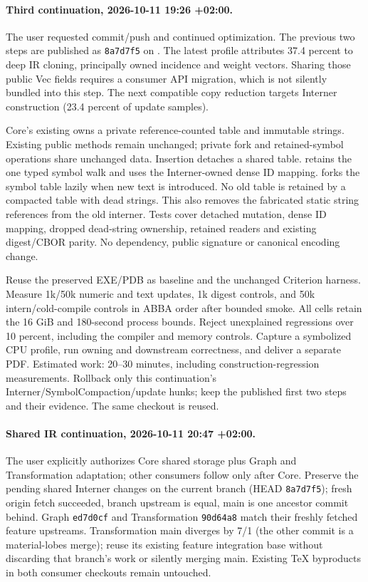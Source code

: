 \documentclass[11pt,a4paper]{article}
\begin{document}
\paragraph{Third continuation, 2026-10-11 19:26 +02:00.}
The user requested commit/push and continued optimization. The previous two steps
are published as \texttt{8a7d7f5} on .
The latest profile attributes 37.4 percent to deep IR cloning, principally owned
incidence and weight vectors. Sharing those public Vec fields requires a consumer
API migration, which is not silently bundled into this step. The next compatible
copy reduction targets Interner construction (23.4 percent of update samples).

Core's existing  owns a private reference-counted
table and immutable strings. Existing public methods remain unchanged; private
fork and retained-symbol operations share unchanged data. Insertion detaches a
shared table.  retains the one typed symbol walk and
uses the Interner-owned dense ID mapping.  forks
the symbol table lazily when new text is introduced. No old table is retained by
a compacted table with dead strings. This also removes the fabricated static
string references from the old interner. Tests cover detached mutation, dense ID
mapping, dropped dead-string ownership, retained readers and existing digest/CBOR
parity. No dependency, public signature or canonical encoding change.

Reuse the preserved  EXE/PDB as baseline and the unchanged
Criterion harness. Measure 1k/50k numeric and text updates, 1k digest controls,
and 50k intern/cold-compile controls in ABBA order after bounded smoke. All cells
retain the 16 GiB and 180-second process bounds. Reject unexplained regressions
over 10 percent, including the compiler and memory controls. Capture a symbolized
CPU profile, run owning and downstream correctness, and deliver a separate PDF.
Estimated work: 20--30 minutes, including construction-regression measurements.
Rollback only this continuation's Interner/SymbolCompaction/update hunks; keep
the published first two steps and their evidence. The same checkout is reused.

\paragraph{Shared IR continuation, 2026-10-11 20:47 +02:00.}
The user explicitly authorizes Core shared storage plus Graph and Transformation
adaptation; other consumers follow only after Core. Preserve the pending shared
Interner changes on the current branch (HEAD \texttt{8a7d7f5}); fresh origin fetch
succeeded, branch upstream is equal, main is one ancestor commit behind.
Graph \texttt{ed7d0cf} and Transformation \texttt{90d64a8} match their freshly
fetched feature upstreams. Transformation main diverges by 7/1 (the other commit
is a material-lobes merge); reuse its existing feature integration base without
discarding that branch's work or silently merging main. Existing TeX byproducts
in both consumer checkouts remain untouched.
\end{document}
